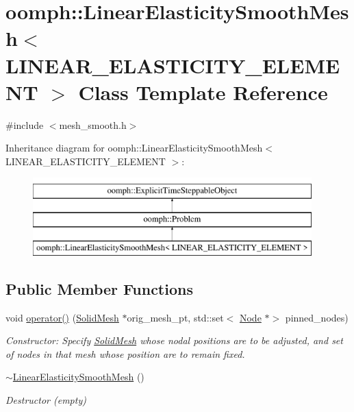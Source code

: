 \hypertarget{classoomph_1_1LinearElasticitySmoothMesh}{}\section{oomph\+:\+:Linear\+Elasticity\+Smooth\+Mesh$<$ L\+I\+N\+E\+A\+R\+\_\+\+E\+L\+A\+S\+T\+I\+C\+I\+T\+Y\+\_\+\+E\+L\+E\+M\+E\+NT $>$ Class Template Reference}
\label{classoomph_1_1LinearElasticitySmoothMesh}


{\ttfamily \#include $<$mesh\+\_\+smooth.\+h$>$}

Inheritance diagram for oomph\+:\+:Linear\+Elasticity\+Smooth\+Mesh$<$ L\+I\+N\+E\+A\+R\+\_\+\+E\+L\+A\+S\+T\+I\+C\+I\+T\+Y\+\_\+\+E\+L\+E\+M\+E\+NT $>$\+:\begin{figure}[H]
\begin{center}
\leavevmode
\includegraphics[height=3.000000cm]{classoomph_1_1LinearElasticitySmoothMesh}
\end{center}
\end{figure}
\subsection*{Public Member Functions}
\begin{DoxyCompactItemize}
\item 
void \hyperlink{classoomph_1_1LinearElasticitySmoothMesh_ada3ce4d2db25f3be160cf3fd83e51a41}{operator()} (\hyperlink{classoomph_1_1SolidMesh}{Solid\+Mesh} $\ast$orig\+\_\+mesh\+\_\+pt, std\+::set$<$ \hyperlink{classoomph_1_1Node}{Node} $\ast$$>$ pinned\+\_\+nodes)
\begin{DoxyCompactList}\small\item\em Constructor\+: Specify \hyperlink{classoomph_1_1SolidMesh}{Solid\+Mesh} whose nodal positions are to be adjusted, and set of nodes in that mesh whose position are to remain fixed. \end{DoxyCompactList}\item 
\hyperlink{classoomph_1_1LinearElasticitySmoothMesh_a8c7add2f256d8abc8ae9304217ee2996}{$\sim$\+Linear\+Elasticity\+Smooth\+Mesh} ()
\begin{DoxyCompactList}\small\item\em Destructor (empty) \end{DoxyCompactList}\end{DoxyCompactItemize}

